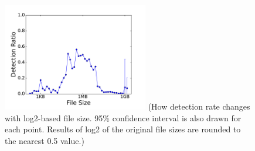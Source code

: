 \begin{figure}[t!]
\begin{center}
\includegraphics[width=2.5in]{figure/size}
  {\footnotesize{(How detection rate changes with log2-based file size.
95\% confidence interval is also drawn for each point.
Results of log2 of the original file sizes are rounded to the nearest 0.5 value.)}}
\end{center}
\end{figure}
